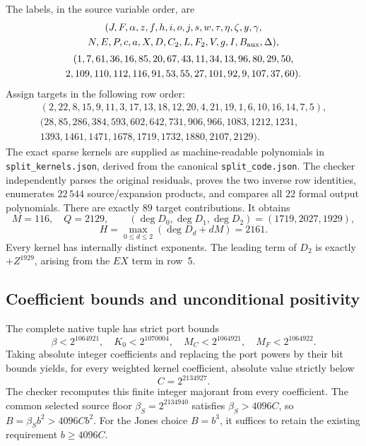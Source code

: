 The labels, in the source variable order, are
\begin{gather*}
 (J,F,\alpha,z,f,h,i,o,j,s,w,\tau,\eta,\zeta,y,\gamma,\\
 N,E,P,c,a,X,D,C_2,L,F_2,V,g,I,B_{\rm aux},\Delta),\\[2pt]
 (1,7,61,36,16,85,20,67,43,11,34,13,96,80,29,50,\\
 2,109,110,112,116,91,53,55,27,101,92,9,107,37,60).
\end{gather*}
Assign targets in the following row order:
\begin{gather*}
 (2,22,8,15,9,11,3,17,13,18,12,20,4,21,19,1,6,10,16,14,7,5),\\
 (28,85,286,384,593,602,642,731,906,966,1083,1212,1231,\\
 1393,1461,1471,1678,1719,1732,1880,2107,2129).
\end{gather*}
The exact sparse kernels are supplied as machine-readable polynomials in
\texttt{split\_kernels.json}, derived from the canonical
\texttt{split\_code.json}.  The checker independently parses the original
residuals, proves the two inverse row identities, enumerates $22\,544$
source/expansion products, and compares all $22$ formal output polynomials.
There are exactly $89$ target contributions.  It obtains
\[
 M=116,\quad Q=2129,\qquad
 (\deg D_0,\deg D_1,\deg D_2)=(1719,2027,1929),
\]
\begin{equation}\label{eq:split-height}
 H=\max_{0\le d\le2}(\deg D_d+dM)=2161.
\end{equation}
Every kernel has internally distinct exponents.  The leading term of $D_2$
is exactly $+Z^{1929}$, arising from the $EX$ term in row~5.

\subsection{Coefficient bounds and unconditional positivity}
The complete native tuple has strict port bounds
\[
 \beta<2^{1064921},\quad K_0<2^{1070004},\quad
 M_C<2^{1064921},\quad M_F<2^{1064922}.
\]
Taking absolute integer coefficients and replacing the port powers by their
bit bounds yields, for every weighted kernel coefficient, absolute value
strictly below
\[
 C=2^{2134927}.
\]
The checker recomputes this finite integer majorant from every coefficient.
The common selected source floor $\beta_S=2^{2134940}$ satisfies
$\beta_S>4096C$, so $B=\beta_Sb^2>4096Cb^2$.  For the Jones choice $B=b^3$,
it suffices to retain the existing requirement $b\ge4096C$.

